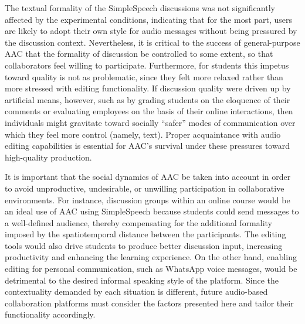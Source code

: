 The textual formality of the SimpleSpeech discussions was not significantly affected by the experimental conditions, indicating that for the most part, users are likely to adopt their own style for audio messages without being pressured by the discussion context.
Nevertheless, it is critical to the success of general-purpose AAC that the formality of discussion be controlled to some extent, so that collaborators feel willing to participate.
Furthermore, for students this impetus toward quality is not as problematic, since they felt more relaxed rather than more stressed with editing functionality.
If discussion quality were driven up by artificial means, however, such as by grading students on the eloquence of their comments or evaluating employees on the basis of their online interactions, then individuals might gravitate toward socially ``safer'' modes of communication over which they feel more control (namely, text).
Proper acquaintance with audio editing capabilities is essential for AAC's survival under these pressures toward high-quality production.

It is important that the social dynamics of AAC be taken into account in order to avoid unproductive, undesirable, or unwilling participation in collaborative environments.
For instance, discussion groups within an online course would be an ideal use of AAC using SimpleSpeech because students could send messages to a well-defined audience, thereby compensating for the additional formality imposed by the spatiotemporal distance between the participants. 
The editing tools would also drive students to produce better discussion input, increasing productivity and enhancing the learning experience.
On the other hand, enabling editing for personal communication, such as WhatsApp voice messages, would be detrimental to the desired informal speaking style of the platform.
Since the contextuality demanded by each situation is different, future audio-based collaboration platforms must consider the factors presented here and tailor their functionality accordingly.